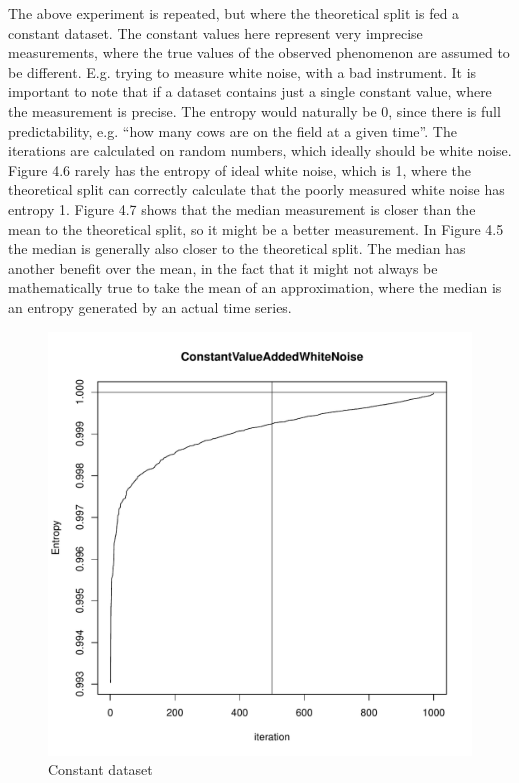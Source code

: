 The above experiment is repeated, but where the theoretical split is fed a constant dataset. The constant values here represent very imprecise measurements, where the true values of the observed phenomenon are assumed to be different. E.g. trying to measure white noise, with a bad instrument. It is important to note that if a dataset contains just a single constant value, where the measurement is precise. The entropy would naturally be 0, since there is full predictability, e.g. “how many cows are on the field at a given time”. The iterations are calculated on random numbers, which ideally should be white noise. Figure 4.6 rarely has the entropy of ideal white noise, which is 1, where the theoretical split can correctly calculate that the poorly measured white noise has entropy 1. Figure 4.7 shows that the median measurement is closer than the mean to the theoretical split, so it might be a better measurement. In Figure 4.5 the median is generally also closer to the theoretical split. The median has another benefit over the mean, in the fact that it might not always be mathematically true to take the mean of an approximation, where the median is an entropy generated by an actual time series.

\begin{figure}
    \centering
\includegraphics[width=\textwidth,keepaspectratio]{./Weather/constantWithWhiteNoiseStochasticTheoretical.pdf}
    \caption{Constant dataset}
\end{figure}

